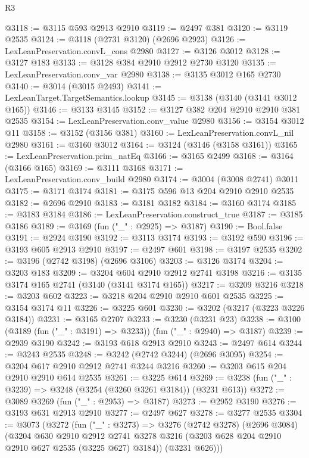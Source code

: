 \begin{lexlean}{R3}
\begin{coremodule}
@3118 := @3115 @593 @2913 @2910
@3119 := @2497 @381
@3120 := @3119 @2535
@3124 := @3118 (@2731 @3120) (@2696 @2923)
@3126 := LexLeanPreservation.convL_cons @2980
@3127 := @3126 @3012
@3128 := @3127 @183
@3133 := @3128 @384 @2910 @2912 @2730 @3120
@3135 := LexLeanPreservation.conv_var @2980
@3138 := @3135 @3012 @165 @2730
@3140 := @3014 (@3015 @2493)
@3141 := LexLeanTarget.TargetSemantics.lookup
@3145 := @3138 (@3140 (@3141 @3012 @165))
@3146 := @3133 @3145
@3152 := @3127 @382 @204 @2910 @2910 @381 @2535
@3154 := LexLeanPreservation.conv_value @2980
@3156 := @3154 @3012 @11
@3158 := @3152 (@3156 @381)
@3160 := LexLeanPreservation.convL_nil @2980
@3161 := @3160 @3012
@3164 := @3124 (@3146 (@3158 @3161))
@3165 := LexLeanPreservation.prim_natEq
@3166 := @3165 @2499
@3168 := @3164 (@3166 @165)
@3169 := @3111 @3168
@3171 := LexLeanPreservation.conv_build @2980
@3174 := @3004 (@3008 @2741) @3011
@3175 := @3171 @3174
@3181 := @3175 @596 @13 @204 @2910 @2910 @2535
@3182 := @2696 @2910
@3183 := @3181 @3182
@3184 := @3160 @3174
@3185 := @3183 @3184
@3186 := LexLeanPreservation.construct_true
@3187 := @3185 @3186
@3189 := @3169 (fun ("_" : @2925) => @3187)
@3190 := Bool.false
@3191 := @2924 @3190
@3192 := @3113 @3174
@3193 := @3192 @590
@3196 := @3193 @605 @2913 @2910
@3197 := @2497 @601
@3198 := @3197 @2535
@3202 := @3196 (@2742 @3198) (@2696 @3106)
@3203 := @3126 @3174
@3204 := @3203 @183
@3209 := @3204 @604 @2910 @2912 @2741 @3198
@3216 := @3135 @3174 @165 @2741 (@3140 (@3141 @3174 @165))
@3217 := @3209 @3216
@3218 := @3203 @602
@3223 := @3218 @204 @2910 @2910 @601 @2535
@3225 := @3154 @3174 @11
@3226 := @3225 @601
@3230 := @3202 (@3217 (@3223 @3226 @3184))
@3231 := @3165 @2707
@3233 := @3230 (@3231 @23)
@3238 := @3100 (@3189 (fun ("_" : @3191) => @3233)) (fun ("_" : @2940) => @3187)
@3239 := @2939 @3190
@3242 := @3193 @618 @2913 @2910
@3243 := @2497 @614
@3244 := @3243 @2535
@3248 := @3242 (@2742 @3244) (@2696 @3095)
@3254 := @3204 @617 @2910 @2912 @2741 @3244 @3216
@3260 := @3203 @615 @204 @2910 @2910 @614 @2535
@3261 := @3225 @614
@3269 := @3238 (fun ("_" : @3239) => @3248 (@3254 (@3260 @3261 @3184)) (@3231 @613))
@3272 := @3089 @3269 (fun ("_" : @2953) => @3187)
@3273 := @2952 @3190
@3276 := @3193 @631 @2913 @2910
@3277 := @2497 @627
@3278 := @3277 @2535
@3304 := @3073
    (@3272
      (fun ("_" : @3273) =>
      @3276
        (@2742 @3278)
        (@2696 @3084)
        (@3204
          @630
          @2910
          @2912
          @2741
          @3278
          @3216
          (@3203 @628 @204 @2910 @2910 @627 @2535 (@3225 @627) @3184))
        (@3231 @626)))

\end{coremodule}
\end{lexlean}

